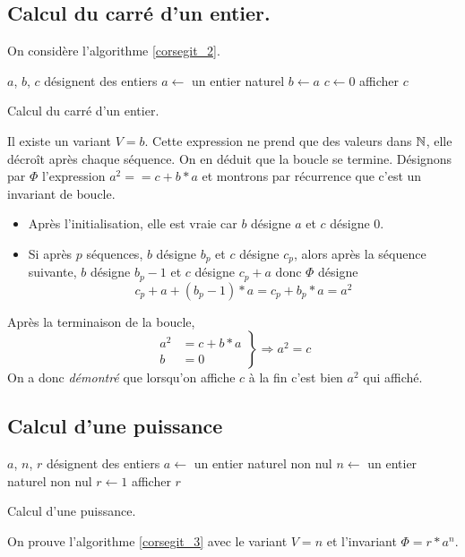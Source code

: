 \subsection{Calcul du carré d'un entier.}
On considère l'algorithme \ref{corsegit_2}.
\begin{algorithm}
  $a$, $b$, $c$ désignent des entiers\;
  $a\longleftarrow$ un entier naturel\;
  $b\longleftarrow a$\;
  $c\longleftarrow 0$\;
  afficher $c$\;
  \caption{Calcul du carré d'un entier.}
  \label{corsegit_2}
\end{algorithm}
Il existe un variant $V = b$. Cette expression ne prend que des valeurs dans $\mathbb{N}$, elle décroît après chaque séquence. On en déduit que la boucle se termine.\newline
Désignons par $\Phi$ l'expression $a^2 == c +b*a$ et montrons par récurrence que c'est un invariant de boucle.
\begin{itemize}
  \item Après l'initialisation, elle est vraie car $b$ désigne $a$ et $c$ désigne $0$.
  \item Si après $p$ séquences, $b$ désigne $b_p$ et $c$ désigne $c_p$, alors après la séquence suivante, $b$ désigne $b_p-1$ et $c$ désigne $c_p+a$ donc $\Phi$ désigne
  \begin{displaymath}
   c_p + a + (b_p-1)*a = c_p + b_p*a = a^2 
  \end{displaymath}
\end{itemize}
Après la terminaison de la boucle,
\begin{displaymath}
  \left. 
  \begin{aligned}
a^2 &= c + b*a \\ b&=0     
  \end{aligned}
\right\rbrace 
\Rightarrow a^2 = c
\end{displaymath}
On a donc \emph{démontré} que lorsqu'on affiche $c$ à la fin c'est bien $a^2$ qui affiché.

\subsection{Calcul d'une puissance}
\begin{algorithm}
  $a$, $n$, $r$ désignent des entiers\;
  $a\longleftarrow$ un entier naturel non nul\;
  $n\longleftarrow$ un entier naturel non nul\;
  $r\longleftarrow 1$\;
  afficher $r$\;
  \caption{Calcul d'une puissance.}
  \label{corsegit_3}
\end{algorithm}
On prouve l'algorithme \ref{corsegit_3} avec le variant $V = n$ et l'invariant $\Phi = r * a^n$.


